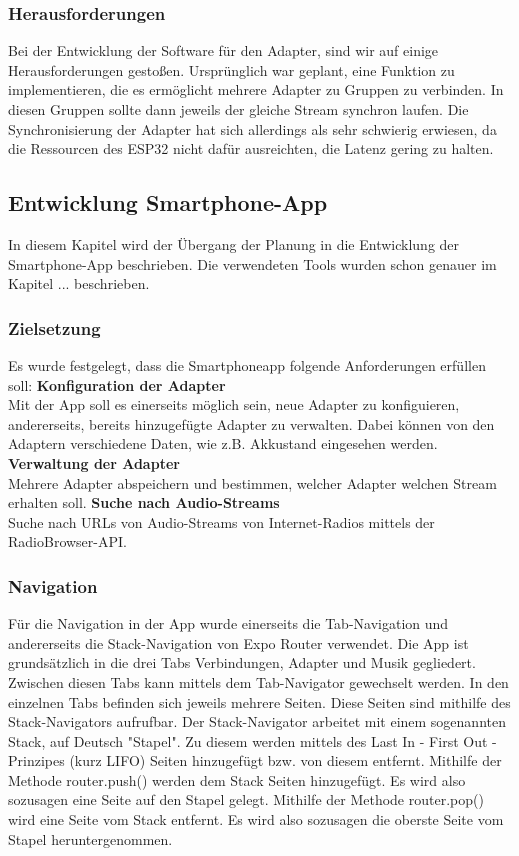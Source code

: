 \documentclass[]{article}
\begin{document}
\subsubsection{Herausforderungen}
Bei der Entwicklung der Software für den Adapter, sind wir auf einige Herausforderungen gestoßen. Ursprünglich war geplant, eine Funktion zu implementieren, die es ermöglicht mehrere Adapter zu Gruppen zu verbinden. In diesen Gruppen sollte dann jeweils der gleiche Stream synchron laufen. Die Synchronisierung der Adapter hat sich allerdings als sehr schwierig erwiesen, da die Ressourcen des ESP32 nicht dafür ausreichten, die Latenz gering zu halten.
\subsection{Entwicklung Smartphone-App}
In diesem Kapitel wird der Übergang der Planung in die Entwicklung der Smartphone-App beschrieben. Die verwendeten Tools wurden schon genauer im Kapitel ... beschrieben.
\subsubsection{Zielsetzung}
Es wurde festgelegt, dass die Smartphoneapp folgende Anforderungen erfüllen soll:
\vspace{4mm}\newline 
\textbf{Konfiguration der Adapter}  \\
Mit der App soll es einerseits möglich sein, neue Adapter zu konfiguieren, andererseits, bereits hinzugefügte Adapter zu verwalten. Dabei können von den Adaptern verschiedene Daten, wie z.B. Akkustand eingesehen werden.
\vspace{4mm}\newline
\textbf{Verwaltung der Adapter} \\
Mehrere Adapter abspeichern und bestimmen, welcher Adapter welchen Stream erhalten soll.
\vspace{4mm}\newline
\textbf{Suche nach Audio-Streams} \\
Suche nach URLs von Audio-Streams von Internet-Radios mittels der RadioBrowser-API.
\subsubsection{Navigation}
Für die Navigation in der App wurde einerseits die Tab-Navigation und andererseits die Stack-Navigation von Expo Router verwendet. Die App ist grundsätzlich in die drei Tabs Verbindungen, Adapter und Musik gegliedert. Zwischen diesen Tabs kann mittels dem Tab-Navigator gewechselt werden. In den einzelnen Tabs befinden sich jeweils mehrere Seiten. Diese Seiten sind mithilfe des Stack-Navigators aufrufbar. Der Stack-Navigator arbeitet mit einem sogenannten Stack, auf Deutsch "Stapel". Zu diesem werden mittels des Last In - First Out - Prinzipes (kurz LIFO) Seiten hinzugefügt bzw. von diesem entfernt. Mithilfe der Methode router.push() werden dem Stack Seiten hinzugefügt. Es wird also sozusagen eine Seite auf den Stapel gelegt. Mithilfe der Methode router.pop() wird eine Seite vom Stack entfernt. Es wird also sozusagen die oberste Seite vom Stapel heruntergenommen.
\end{document}

